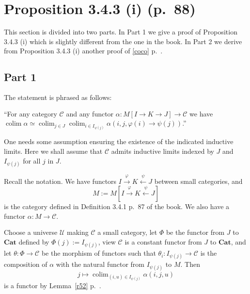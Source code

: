 \documentclass[12pt]{article}
\theoremstyle{remark}
\theoremstyle{definition}
\newcommand{\C}{\mathcal C}
\newcommand{\U}{\mathcal U}
\newcommand{\Cat}{\mathbf{Cat}}%
\DeclareMathOperator*{\co}{colim}
\begin{document}
\section{Proposition 3.4.3 (i) (p.~88)} %
%
This section is divided into two parts. In Part 1 we give a proof of Proposition 3.4.3 (i) which is slightly different from the one in the book. In Part 2 we derive from Proposition 3.4.3 (i) another proof of \eqref{coco} p.~\pageref{coco}. 
%
\subsection{Part 1} 
%
The statement is phrased as follows: 

``For any category $\C$ and any functor $\alpha:M[I\to K\rightarrow J]\to\C$ we have $\co\alpha\simeq\co_{j\in J}\co_{i\in I_{\psi(j)}}\alpha(i,j,\varphi(i)\to\psi(j))$.'' 

One needs some assumption ensuring the existence of the indicated inductive limits. Here we shall assume that $\C$ admits inductive limits indexed by $J$ and $I_{\psi(j)}$ for all $j$ in $J$. 

Recall the notation. We have functors $I\xrightarrow\varphi K\xleftarrow\psi J$ between small categories, and 
$$
M:=M[I\xrightarrow\varphi K\xleftarrow\psi J] 
$$ 
is the category defined in Definition 3.4.1 p.~87 of the book. We also have a functor $\alpha:M\to\C$. 

Choose a universe $\U$ making $\C$ a small category, let $\Phi$ be the functor from $J$ to $\Cat$ defined by $\Phi(j):=I_{\psi(j)}$, view $\C$ is a constant functor from $J$ to $\Cat$, and let $\theta:\Phi\to\C$ be the morphism of functors such that $\theta_i:I_{\psi(j)}\to\C$ is the composition of $\alpha$ with the natural functor from $I_{\psi(j)}$ to $M$. Then 
$$
j\mapsto\co_{(i,u)\in I_{\psi(j)}}\alpha(i,j,u) 
$$ 
is a functor by Lemma~\ref{r52} p.~\pageref{r52}. 
\end{document}
